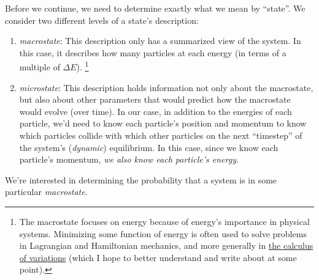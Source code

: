 \documentclass[letterpaper,12pt]{report}
\providecommand{\tightlist}{%
  \setlength{\itemsep}{0pt}\setlength{\parskip}{0pt}}
\begin{document}
Before we continue, we need to determine exactly what we mean by ``state''. We consider
two different levels of a state's description:
\begin{enumerate}
  \tightlist
  \item
    \emph{macrostate}: This description only has a summarized view of the system. In this case,
      it describes how many particles at each energy (in terms of a multiple of \(\Delta E\)).
      \footnote{
      The macrostate focuses on energy because of energy's importance in physical systems.
      Minimizing some function of energy is often used to solve problems in Lagrangian and
      Hamiltonian mechanics, and more generally in
      \href{https://en.wikipedia.org/wiki/Calculus_of_variations}{the calculus of variations}
      (which I hope to better understand and write about at some point).
      }
  \item 
    \emph{microstate}: This description holds information not only about the macrostate,
      but also about other parameters that would predict how the macrostate would evolve
      (over time). In our case, in addition to the
      energies of each particle, 
      we'd need to know each particle's position and momentum to know which particles collide
      with which other particles on the next ``timestep'' of the system's (\emph{dynamic})
      equilibrium. In this case, since we know each particle's momentum, 
      \emph{we also know each particle's energy.}
\end{enumerate}

We're interested in determining the probability that a system is in some particular
\emph{macrostate}.
\end{document}
